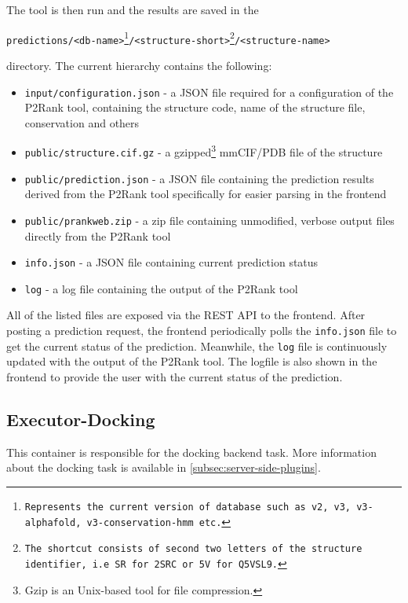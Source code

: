 The tool is then run and the results are saved in the

\texttt{predictions/<db-name>\footnote{Represents the current version of database such as v2, v3,  v3-alphafold, v3-conservation-hmm etc.}/<structure-short>\footnote{The shortcut consists of second two letters of the structure identifier, i.e \texttt{SR} for \texttt{2SRC} or \texttt{5V} for \texttt{Q5VSL9}.}/<structure-name>} 

directory. The current hierarchy contains the following:
\begin{itemize}
    \item \texttt{input/configuration.json} - a JSON file required for a configuration of the P2Rank tool, containing the structure code, name of the structure file, conservation and others
    \item \texttt{public/structure.cif.gz} - a gzipped\footnote{Gzip is an Unix-based tool for file compression.} mmCIF/PDB file of the structure
    \item \texttt{public/prediction.json} - a JSON file containing the prediction results derived from the P2Rank tool specifically for easier parsing in the frontend
    \item \texttt{public/prankweb.zip} - a zip file containing unmodified, verbose output files directly from the P2Rank tool
    \item \texttt{info.json} - a JSON file containing current prediction status
    \item \texttt{log} - a log file containing the output of the P2Rank tool
\end{itemize}

All of the listed files are exposed via the REST API to the frontend. After posting a prediction request, the frontend periodically polls the \texttt{info.json} file to get the current status of the prediction. Meanwhile, the \texttt{log} file is continuously updated with the output of the P2Rank tool. The logfile is also shown in the frontend to provide the user with the current status of the prediction.

\subsection{Executor-Docking}
\label{subsec:executor-docking}

This container is responsible for the docking backend task. More information about the docking task is available in \cref{subsec:server-side-plugins}.

